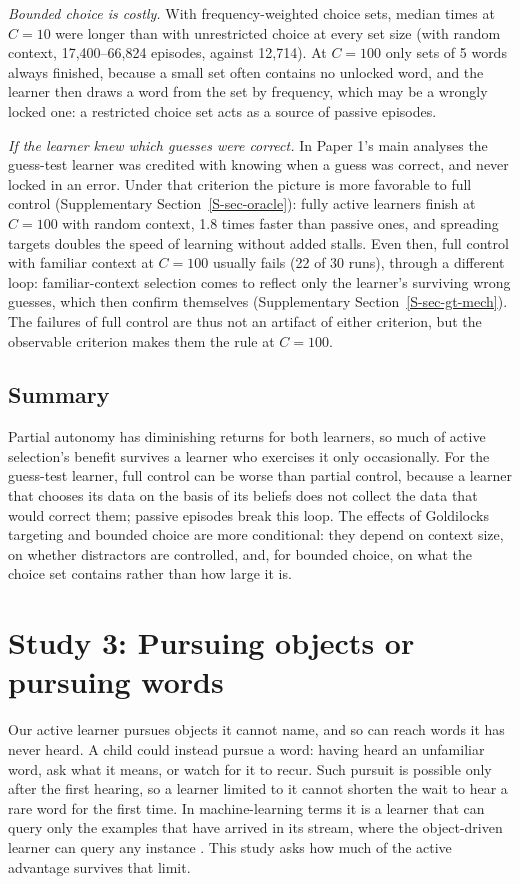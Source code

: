 \documentclass[a4paper,natbib,man]{apa6}
\begin{document}
\textit{Bounded choice is costly.} With frequency-weighted choice sets, median times at $C=10$ were longer than with unrestricted choice at every set size (with random context, 17,400--66,824 episodes, against 12,714). At $C=100$ only sets of 5 words always finished, because a small set often contains no unlocked word, and the learner then draws a word from the set by frequency, which may be a wrongly locked one: a restricted choice set acts as a source of passive episodes.

\textit{If the learner knew which guesses were correct.} In Paper 1's main analyses the guess-test learner was credited with knowing when a guess was correct, and never locked in an error. Under that criterion the picture is more favorable to full control (Supplementary Section~\ref{S-sec-oracle}): fully active learners finish at $C=100$ with random context, 1.8 times faster than passive ones, and spreading targets doubles the speed of learning without added stalls. Even then, full control with familiar context at $C=100$ usually fails (22 of 30 runs), through a different loop: familiar-context selection comes to reflect only the learner's surviving wrong guesses, which then confirm themselves (Supplementary Section~\ref{S-sec-gt-mech}). The failures of full control are thus not an artifact of either criterion, but the observable criterion makes them the rule at $C=100$.

\subsection{Summary}
Partial autonomy has diminishing returns for both learners, so much of active selection's benefit survives a learner who exercises it only occasionally. For the guess-test learner, full control can be worse than partial control, because a learner that chooses its data on the basis of its beliefs does not collect the data that would correct them; passive episodes break this loop. The effects of Goldilocks targeting and bounded choice are more conditional: they depend on context size, on whether distractors are controlled, and, for bounded choice, on what the choice set contains rather than how large it is.

\section{Study 3: Pursuing objects or pursuing words}
\label{sec-word-driven}

Our active learner pursues objects it cannot name, and so can reach words it has never heard. A child could instead pursue a word: having heard an unfamiliar word, ask what it means, or watch for it to recur. Such pursuit is possible only after the first hearing, so a learner limited to it cannot shorten the wait to hear a rare word for the first time. In machine-learning terms it is a learner that can query only the examples that have arrived in its stream, where the object-driven learner can query any instance \citep{Angluin:1988,Settles:2012}. This study asks how much of the active advantage survives that limit.
\end{document}
